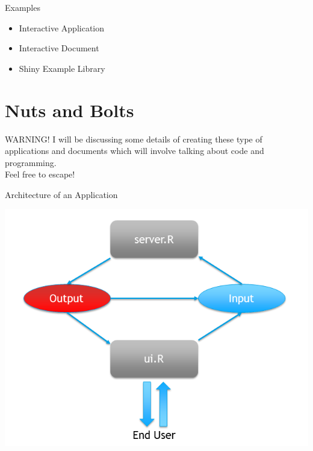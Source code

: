 \documentclass{beamer}\usepackage[]{graphicx}\usepackage[]{color}
\begin{document}
\begin{frame}{Examples}
\begin{itemize}
\item Interactive Application
\bigskip
\item Interactive Document
\bigskip
\item Shiny Example Library
\end{itemize}
\end{frame}

\section{Nuts and Bolts}

\begin{frame}{WARNING!}
I will be discussing some details of creating these type of applications and documents which will involve talking about code and programming.\\ Feel free to escape!
\end{frame}

\begin{frame}{Architecture of an Application}
\begin{center}
\includegraphics[scale=.4]{./Figures/FullArchitecture}
\end{center}
\end{frame}
\end{document}
